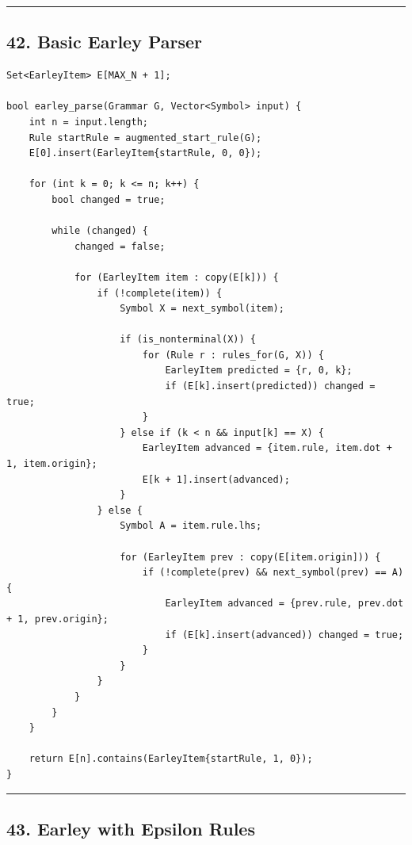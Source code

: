 \documentclass[10pt,letterpaper]{article}
\begin{document}
\medskip\hrule\medskip

\subsection*{42. Basic Earley Parser}

\begin{verbatim}
Set<EarleyItem> E[MAX_N + 1];

bool earley_parse(Grammar G, Vector<Symbol> input) {
    int n = input.length;
    Rule startRule = augmented_start_rule(G);
    E[0].insert(EarleyItem{startRule, 0, 0});

    for (int k = 0; k <= n; k++) {
        bool changed = true;

        while (changed) {
            changed = false;

            for (EarleyItem item : copy(E[k])) {
                if (!complete(item)) {
                    Symbol X = next_symbol(item);

                    if (is_nonterminal(X)) {
                        for (Rule r : rules_for(G, X)) {
                            EarleyItem predicted = {r, 0, k};
                            if (E[k].insert(predicted)) changed = true;
                        }
                    } else if (k < n && input[k] == X) {
                        EarleyItem advanced = {item.rule, item.dot + 1, item.origin};
                        E[k + 1].insert(advanced);
                    }
                } else {
                    Symbol A = item.rule.lhs;

                    for (EarleyItem prev : copy(E[item.origin])) {
                        if (!complete(prev) && next_symbol(prev) == A) {
                            EarleyItem advanced = {prev.rule, prev.dot + 1, prev.origin};
                            if (E[k].insert(advanced)) changed = true;
                        }
                    }
                }
            }
        }
    }

    return E[n].contains(EarleyItem{startRule, 1, 0});
}
\end{verbatim}

\medskip\hrule\medskip

\subsection*{43. Earley with Epsilon Rules}
\end{document}
